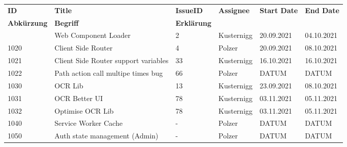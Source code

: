 

\begin{longtable}{|p{}|p{}|p{}|p{}|p{}|p{}|} \hline
    \textbf{ID} & \textbf{Title} & \textbf{Issue\-ID} & \textbf{Assignee} & \textbf{Start Date} & \textbf{End\- Date} \\ \hhline{|=|=|=|=|=|=|}
    \endfirsthead
    \hline
    \textbf{Abkürzung} & \textbf{Begriff} & \textbf{Erklärung} \\ \hhline{|=|=|=|}
    \endhead
    1010 & Web Component Loader & 2 & Kusternigg & 20.09.2021 & 04.10.2021 \\ \hline
    1020 & Client Side Router & 4 & Polzer & 20.09.2021 & 08.10.2021 \\ \hline
    1021 & Client Side Router support variables & 33 & Kusternigg & 16.10.2021 & 16.10.2021 \\ \hline
    1022 & Path action call multipe times bug & 66 & Polzer &  DATUM & DATUM \\ \hline
    1030 & OCR Lib & 13 & Kusternigg & 23.09.2021 & 08.10.2021 \\ \hline
    1031 & OCR Better UI & 78 & Kusternigg & 03.11.2021 & 05.11.2021 \\ \hline
    1032 & Optimise OCR Lib & 78 & Kusternigg & 03.11.2021 & 05.11.2021 \\ \hline
    1040 & Service Worker Cache & - & Polzer & DATUM & DATUM \\ \hline
    1050 & Auth state management (Admin) & - & Polzer & DATUM & DATUM \\ \hline
\end{longtable}



